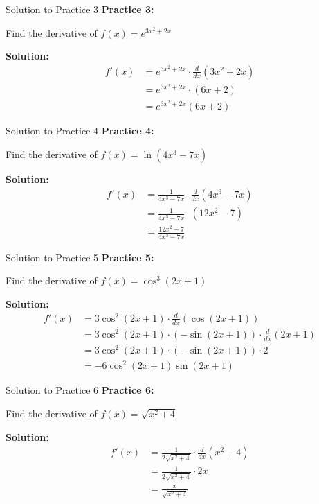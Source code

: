 \documentclass[aspectratio=169]{beamer}
\begin{document}
\begin{frame}{Solution to Practice 3}
\textbf{Practice 3:}

Find the derivative of $f(x) = e^{3x^2 + 2x}$

\textbf{Solution:}
\[
\begin{aligned}
  f'(x) &= e^{3x^2 + 2x} \cdot \frac{d}{dx}(3x^2 + 2x) \\
  &= e^{3x^2 + 2x} \cdot (6x + 2) \\
  &= e^{3x^2 + 2x}(6x + 2)
\end{aligned}
\]
\end{frame}

\begin{frame}{Solution to Practice 4}
\textbf{Practice 4:}

Find the derivative of $f(x) = \ln(4x^3 - 7x)$

\textbf{Solution:}
\[
\begin{aligned}
  f'(x) &= \frac{1}{4x^3 - 7x} \cdot \frac{d}{dx}(4x^3 - 7x) \\
  &= \frac{1}{4x^3 - 7x} \cdot (12x^2 - 7) \\
  &= \frac{12x^2 - 7}{4x^3 - 7x}
\end{aligned}
\]
\end{frame}

\begin{frame}{Solution to Practice 5}
\textbf{Practice 5:}

Find the derivative of $f(x) = \cos^3(2x + 1)$

\textbf{Solution:}
\[
\begin{aligned}
  f'(x) &= 3\cos^2(2x + 1) \cdot \frac{d}{dx}(\cos(2x + 1)) \\
  &= 3\cos^2(2x + 1) \cdot (-\sin(2x + 1)) \cdot \frac{d}{dx}(2x + 1) \\
  &= 3\cos^2(2x + 1) \cdot (-\sin(2x + 1)) \cdot 2 \\
  &= -6\cos^2(2x + 1)\sin(2x + 1)
\end{aligned}
\]
\end{frame}

\begin{frame}{Solution to Practice 6}
\textbf{Practice 6:}

Find the derivative of $f(x) = \sqrt{x^2 + 4}$

\textbf{Solution:}
\[
\begin{aligned}
  f'(x) &= \frac{1}{2\sqrt{x^2 + 4}} \cdot \frac{d}{dx}(x^2 + 4) \\
  &= \frac{1}{2\sqrt{x^2 + 4}} \cdot 2x \\
  &= \frac{x}{\sqrt{x^2 + 4}}
\end{aligned}
\]
\end{frame}
\end{document}
